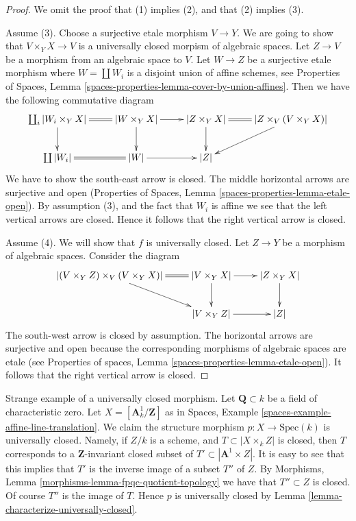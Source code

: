 \begin{proof}
We omit the proof that (1) implies (2), and that (2) implies (3).

\medskip\noindent
Assume (3). Choose a surjective etale morphism $V \to Y$.
We are going to show that $V \times_Y X \to V$ is a universally
closed morpism of algebraic spaces. Let $Z \to V$ be a morphism
from an algebraic space to $V$. Let $W \to Z$ be a surjective etale
morphism where $W = \coprod W_i$ is a disjoint union of affine schemes, see
Properties of Spaces,
Lemma \ref{spaces-properties-lemma-cover-by-union-affines}.
Then we have the following commutative diagram
$$
\xymatrix{
\coprod_i |W_i \times_Y X| \ar@{=}[r] \ar[d] &
|W \times_Y X| \ar[r] \ar[d] &
|Z \times_Y X| \ar[d] \ar@{=}[r] &
|Z \times_V (V \times_Y X)| \ar[ld] \\
\coprod |W_i| \ar@{=}[r] &
|W| \ar[r] &
|Z|
}
$$
We have to show the south-east arrow is closed. The middle horizontal
arrows are surjective and open
(Properties of Spaces, Lemma \ref{spaces-properties-lemma-etale-open}).
By assumption (3), and the fact that
$W_i$ is affine we see that the left vertical arrows are closed. Hence
it follows that the right vertical arrow is closed.

\medskip\noindent
Assume (4). We will show that $f$ is universally closed.
Let $Z \to Y$ be a morphism of algebraic spaces. Consider the
diagram
$$
\xymatrix{
|(V \times_Y Z) \times_V (V \times_Y X)| \ar@{=}[r] \ar[rd] &
|V \times_Y X| \ar[r] \ar[d] &
|Z \times_Y X| \ar[d] \\
 &
|V \times_Y Z| \ar[r] &
|Z|
}
$$
The south-west arrow is closed by assumption. The horizontal arrows are
surjective and open because the corresponding morphisms of
algebraic spaces are etale (see
Properties of spaces, Lemma \ref{spaces-properties-lemma-etale-open}).
It follows that the right vertical arrow is closed.
\end{proof}

\begin{example}
\label{example-strange-universally-closed}
Strange example of a universally closed morphism.
Let $\mathbf{Q} \subset k$ be a field of characteristic zero.
Let $X = [\mathbf{A}^1_k/\mathbf{Z}]$ as in
Spaces, Example \ref{spaces-example-affine-line-translation}.
We claim the structure morphism $p : X \to \text{Spec}(k)$
is universally closed.
Namely, if $Z/k$ is a scheme, and $T \subset |X \times_k Z|$ is closed,
then $T$ corresponds to a $\mathbf{Z}$-invariant closed subset of
$T' \subset |\mathbf{A}^1 \times Z|$. It is easy to see that
this implies that $T'$ is the inverse image of a subset $T''$ of
$Z$. By
Morphisms, Lemma \ref{morphisms-lemma-fpqc-quotient-topology}
we have that $T'' \subset Z$ is closed.
Of course $T''$ is the image of $T$. Hence $p$ is universally
closed by Lemma \ref{lemma-characterize-universally-closed}.
\end{example}





